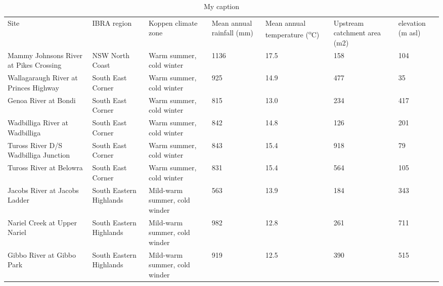 \begin{table}[]
\centering
\caption{My caption}
\label{my-label}
\begin{tabular}{lllllll}
Site                                   & IBRA region              & Koppen climate zone           & Mean annual rainfall (mm) & Mean annual temperature (\textsuperscript{o}C) & Upstream catchment area (m2) & elevation (m asl) \\
Mammy Johnsons River at Pikes Crossing & NSW North Coast          & Warm summer, cold winter      & 1136                      & 17.5                         & 158                          & 104               \\
Wallagaraugh River at Princes Highway  & South East Corner        & Warm summer, cold winter      & 925                       & 14.9                         & 477                          & 35                \\
Genoa River at Bondi                   & South East Corner        & Warm summer, cold winter      & 815                       & 13.0                         & 234                          & 417               \\
Wadbilliga River at Wadbilliga         & South East Corner        & Warm summer, cold winter      & 842                       & 14.8                         & 126                          & 201               \\
Tuross River D/S Wadbilliga Junction   & South East Corner        & Warm summer, cold winter      & 843                       & 15.4                         & 918                          & 79                \\
Tuross River at Belowra                & South East Corner        & Warm summer, cold winter      & 831                       & 15.4                         & 564                          & 105               \\
Jacobs River at Jacobs Ladder          & South Eastern Highlands  & Mild-warm summer, cold winder & 563                       & 13.9                         & 184                          & 343               \\
Nariel Creek at Upper Nariel           & South Eastern Highlands  & Mild-warm summer, cold winder & 982                       & 12.8                         & 261                          & 711               \\
Gibbo River at Gibbo Park              & South Eastern Highlands  & Mild-warm summer, cold winder & 919                       & 12.5                         & 390                          & 515               \\

\end{tabular}
\end{table}
